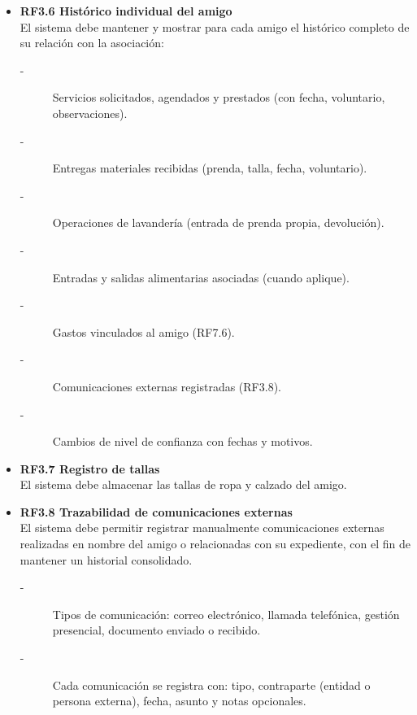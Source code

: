 \begin{itemize}
    
    \item \textbf{RF3.6 Histórico individual del amigo}\hypertarget{RF3.6}{} \\
    El sistema debe mantener y mostrar para cada amigo el histórico
    completo de su relación con la asociación:
    \begin{description}
        \item[-] Servicios solicitados, agendados y prestados (con fecha, voluntario, observaciones).
        \item[-] Entregas materiales recibidas (prenda, talla, fecha, voluntario).
        \item[-] Operaciones de lavandería (entrada de prenda propia, devolución).
        \item[-] Entradas y salidas alimentarias asociadas (cuando aplique).
        \item[-] Gastos vinculados al amigo (RF7.6).
        \item[-] Comunicaciones externas registradas (RF3.8).
        \item[-] Cambios de nivel de confianza con fechas y motivos.
    \end{description}

    \item \textbf{RF3.7 Registro de tallas} \\
    El sistema debe almacenar las tallas de ropa y calzado del amigo.
    
    \item \textbf{RF3.8 Trazabilidad de comunicaciones externas} \\
    El sistema debe permitir registrar manualmente comunicaciones externas
    realizadas en nombre del amigo o relacionadas con su expediente, con el
    fin de mantener un historial consolidado.
    \begin{description}
        \item[-] Tipos de comunicación: correo electrónico, llamada telefónica, gestión presencial, documento enviado o recibido.
        \item[-] Cada comunicación se registra con: tipo, contraparte (entidad o persona externa), fecha, asunto y notas opcionales.
    \end{description}


\end{itemize}
